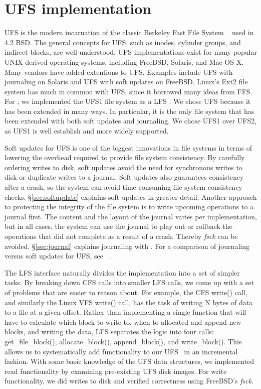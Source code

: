 \section{UFS implementation}
\label{sec:ufs}

UFS is the modern incarnation of the classic Berkeley Fast File System
~\cite{mckusick84fast} used in 4.2 BSD. The general concepts for UFS, such as
inodes, cylinder groups, and indirect blocks, are well understood. UFS
implementations exist for many popular UNIX-derived operating systems,
including FreeBSD, Solaris, and Mac OS X. Many vendors have added extentions
to UFS. Examples include UFS with journaling on Solaris and UFS with soft
updates on FreeBSD. Linux's Ext2 file system has much in common with UFS,
since it borrowed many ideas from FFS. For \Kudos, we implemented the UFS1
file system as a LFS \module. We chose UFS because it has been extended in
many ways. In particular, it is the only file system that has been extended
with both soft updates and journaling. We chose UFS1 over UFS2, as UFS1 is
well establish and more widely supported.

Soft updates for UFS is one of the biggest innovations in file systems in
terms of lowering the overhead required to provide file system consistency.
By carefully ordering writes to disk, soft updates avoid the need for
synchronous writes to disk or duplicate writes to a journal. Soft updates also
guarantees consistency after a crash, so the system can avoid time-consuming
file system consistency checks. \S\ref{sec:softupdate} explains soft updates
in greater detail.
Another approach to protecting the integrity of the file system is to write
upcoming operations to a journal first. The content and the layout of the
journal varies per implementation, but in all cases, the system can use the
journal to play out or rollback the operations that did not complete as a
result of a crash. Thereby \emph{fsck} can be avoided. \S\ref{sec:journal}
explains journaling with \chdescs.
For a comparison of journaling versus soft updates for UFS, see
~\cite{seltzer00journaling}.

The LFS interface naturally divides the implementation into a set of simpler
tasks. By breaking down CFS calls into smaller LFS calls, we come up with a
set of problems that are easier to reason about. For example, the CFS write()
call, and similarly the Linux VFS write() call, has the task of writing N
bytes of data to a file at a given offset. Rather than implementing a single
function that will have to calculate which block to write to, when to
allocated and append new blocks, and writing the data, LFS separates the
logic into four calls:
get\_file\_block(), allocate\_block(), append\_block(), and write\_block().
This allows us to systematically add functionality to our UFS \module\ in
an incremental fashion. With some basic knowledge of the UFS data structures,
we implemented read functionality by examining pre-existing UFS disk images.
For write functionality, we did writes to disk and verified correctness using
FreeBSD's \emph{fsck}.

